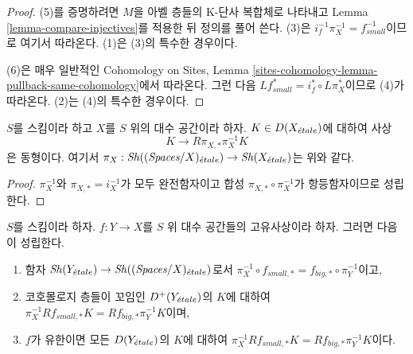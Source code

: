 \begin{proof}
(5)를 증명하려면 $M$을 아벨 층들의 K-단사 복합체로 나타내고
Lemma \ref{lemma-compare-injectives}를 적용한 뒤 정의를 풀어 쓴다.
(3)은 $i_f^{-1}\pi_X^{-1} = f_{small}^{-1}$이므로 여기서 따라온다.
(1)은 (3)의 특수한 경우이다.

\medskip\noindent
(6)은 매우 일반적인 Cohomology on Sites, Lemma
\ref{sites-cohomology-lemma-pullback-same-cohomology}에서 따라온다.
그런 다음 $Lf_{small}^* = i_f^* \circ L\pi_X^*$이므로 (4)가 따라온다.
(2)는 (4)의 특수한 경우이다.
\end{proof}

\begin{lemma}
\label{lemma-cohomological-descent-etale}
$S$를 스킴이라 하고 $X$를 $S$ 위의 대수 공간이라 하자.
$K \in D(X_{\acute{e}tale})$에 대하여 사상
$$
K \longrightarrow R\pi_{X, *}\pi_X^{-1}K
$$
은 동형이다. 여기서
$\pi_X : \mathop{\mathit{Sh}}\nolimits((\textit{Spaces}/X)_{\acute{e}tale}) \to \mathop{\mathit{Sh}}\nolimits(X_{\acute{e}tale})$는 위와 같다.
\end{lemma}

\begin{proof}
$\pi_X^{-1}$와 $\pi_{X, *} = i_X^{-1}$가 모두 완전함자이고 합성
$\pi_{X, *} \circ \pi_X^{-1}$가 항등함자이므로 성립한다.
\end{proof}

\begin{lemma}
\label{lemma-compare-higher-direct-image-proper}
$S$를 스킴이라 하자.
$f : Y \to X$를 $S$ 위 대수 공간들의 고유사상이라 하자.
그러면 다음이 성립한다.
\begin{enumerate}
\item 함자 $\mathop{\mathit{Sh}}\nolimits(Y_{\acute{e}tale}) \to \mathop{\mathit{Sh}}\nolimits((\textit{Spaces}/X)_{\acute{e}tale})$로서
$\pi_X^{-1} \circ f_{small, *} = f_{big, *} \circ \pi_Y^{-1}$이고,
\item 코호몰로지 층들이 꼬임인 $D^+(Y_{\acute{e}tale})$의 $K$에 대하여\\
$\pi_X^{-1}Rf_{small, *}K = Rf_{big, *}\pi_Y^{-1}K$이며,
\item $f$가 유한이면 모든 $D(Y_{\acute{e}tale})$의 $K$에 대하여
$\pi_X^{-1}Rf_{small, *}K = Rf_{big, *}\pi_Y^{-1}K$이다.
\end{enumerate}
\end{lemma}

